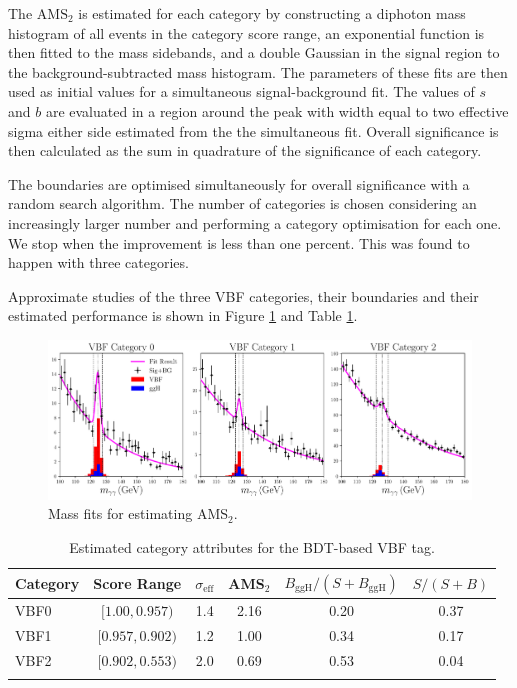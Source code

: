 The $\mathrm{AMS}_2$ is estimated for each category by constructing a diphoton mass histogram of all events in the category score range, an exponential function is then fitted to the mass sidebands, and a double Gaussian in the signal region to the background-subtracted mass histogram. The parameters of these fits are then used as initial values for a simultaneous signal-background fit. 
The values of $s$ and $b$ are evaluated in a region around the peak with width equal to two effective sigma either side estimated from the the simultaneous fit. Overall significance is then calculated as the sum in quadrature of the significance of each category. 

The boundaries are optimised simultaneously for overall significance with a random search algorithm. The number of categories is chosen considering an increasingly larger number and performing a category optimisation for each one. We stop when the improvement is less than one percent. This was found to happen with three categories. 

Approximate studies of the three VBF categories, their boundaries and their estimated performance is shown in Figure \ref{fig:event_categorisaton:bdt_mass_fits} and Table \ref{tab:event_selection:legacy_cats}.
\begin{figure}[h!]
    \centering
    \includegraphics[width=1.0\textwidth]{figures/event_selection/BDT_mass_fits.pdf}
    \caption{Mass fits for estimating AMS$_2$.}
    \label{fig:event_categorisaton:bdt_mass_fits}
\end{figure}
\begin{table}[h!]
    \centering
    \renewcommand{\arraystretch}{1.3}
    \begin{tabular}{ l | c c c c c }
        \thickhline
        Category & Score Range & $\sigma_{\mathrm{eff}}$ & AMS$_2$ & $B_{\mathrm{ggH}}/(S+B_{\mathrm{ggH}})$ & $S/(S+B)$ \\
        \hline
        VBF0 & $[1.00, 0.957)$     & 1.4 &  2.16 & 0.20 & 0.37 \\
        VBF1 & $[0.957, 0.902)$ & 1.2 &  1.00  & 0.34 & 0.17 \\
        VBF2 & $[0.902, 0.553)$ & 2.0 &  0.69 & 0.53 & 0.04 \\
        \thickhline
    \end{tabular}
    \caption{Estimated category attributes for the BDT-based VBF tag.}
    \label{tab:event_selection:legacy_cats}
\end{table}






